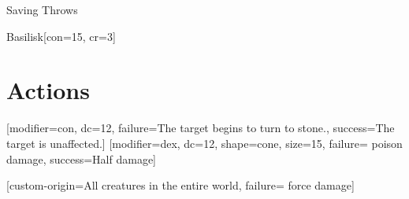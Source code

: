 \begin{ExampleBlock}{Saving Throws}
\begin{RpgStat}{Basilisk}[con=15, cr=3]
    \section{Actions}
        [modifier=con, dc=12,
            failure={The target begins to turn to stone.}, success={The target is unaffected.}]
        [modifier=dex, dc=12, shape=cone, size=15,
            failure={ poison damage}, success={Half damage}]

        [custom-origin={All creatures in the entire world}, failure={ force damage}]
\end{RpgStat}


\end{ExampleBlock}
